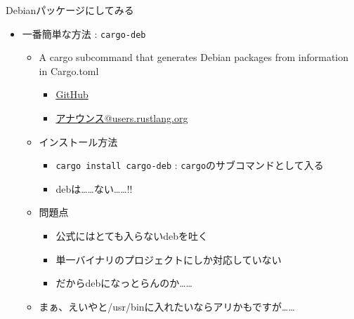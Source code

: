 \documentclass[cjk,dvipdfmx,10pt,compress,fragile%
hyperref={bookmarks=true,bookmarksnumbered=true,bookmarksopen=false,%
colorlinks=false,%
pdftitle={第 134 回 関西 Debian 勉強会},%
pdfauthor={小林},%
pdfsubject={資料},%
}]{beamer}
\begin{document}

\begin{frame}[t,fragile]{Debianパッケージにしてみる}
 \begin{itemize}
  \item 一番簡単な方法 : \texttt{cargo-deb}
	\begin{itemize}
	 \item A cargo subcommand that generates Debian packages from information in Cargo.toml
	       \begin{itemize}
		\item \href{https://github.com/mmstick/cargo-deb}{GitHub}
		\item \href{https://users.rust-lang.org/t/cargo-deb-make-debian-packages-from-cargo-projects/12199}{アナウンス@users.rustlang.org}
	       \end{itemize}
	 \item インストール方法
	       \begin{itemize}
		\item \verb|cargo install cargo-deb| : \verb|cargo|のサブコマンドとして入る
		\item debは……ない……!!
	       \end{itemize}
	 \item 問題点
	       \begin{itemize}
		\item 公式にはとても入らないdebを吐く
		\item 単一バイナリのプロジェクトにしか対応していない
		\item だからdebになっとらんのか……
	       \end{itemize}
	 \item まぁ、えいやと/usr/binに入れたいならアリかもですが……
	\end{itemize}
 \end{itemize}
\end{frame}
\end{document}
